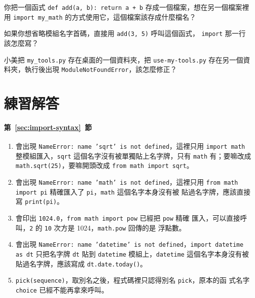 \begin{drills}[label=drills:write-your-own-module]
\item 你把一個函式 \texttt{def add(a, b): return a + b} 存成一個檔案，想在另一個檔案裡
用 \texttt{import my\_math} 的方式使用它，這個檔案該存成什麼檔名？
\item 如果你想省略模組名字首碼，直接用 \texttt{add(3, 5)} 呼叫這個函式，
\texttt{import} 那一行該怎麼寫？
\item 小美把 \texttt{my\_tools.py} 存在桌面的一個資料夾，把 \texttt{use-my-tools.py}
存在另一個資料夾，執行後出現 \texttt{ModuleNotFoundError}，該怎麼修正？
\end{drills}

\section*{練習解答}

\paragraph{第~\ref{sec:import-syntax}~節}
\begin{enumerate}
\item 會出現 \texttt{NameError: name 'sqrt' is not defined}，這裡只用
\texttt{import math} 整模組匯入，\texttt{sqrt} 這個名字沒有被單獨貼上名字牌，只有
\texttt{math} 有；要嘛改成 \texttt{math.sqrt(25)}，要嘛開頭改成
\texttt{from math import sqrt}。
\item 會出現 \texttt{NameError: name 'math' is not defined}，這裡只用
\texttt{from math import pi} 精確匯入了 \texttt{pi}，\texttt{math} 這個名字本身沒有被
貼過名字牌，應該直接寫 \texttt{print(pi)}。
\item 會印出 \texttt{1024.0}，\texttt{from math import pow} 已經把 \texttt{pow} 精確
匯入，可以直接呼叫，\texttt{2} 的 \texttt{10} 次方是 1024，\texttt{math.pow} 回傳的是
浮點數。
\item 會出現 \texttt{NameError: name 'datetime' is not defined}，\texttt{import
datetime as dt} 只把名字牌 \texttt{dt} 貼到 \texttt{datetime} 模組上，\texttt{datetime}
這個名字本身沒有被貼過名字牌，應該寫成 \texttt{dt.date.today()}。
\item \texttt{pick(sequence)}，取別名之後，程式碼裡只認得別名 \texttt{pick}，原本的函
式名字 \texttt{choice} 已經不能再拿來呼叫。
\end{enumerate}

